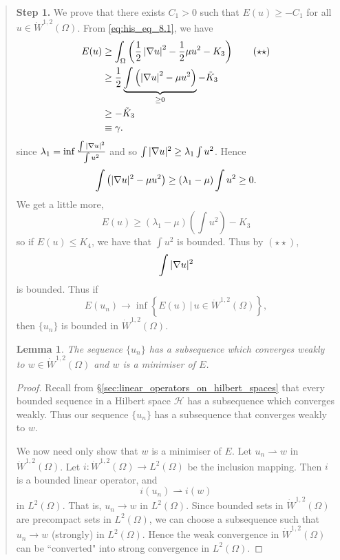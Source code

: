 \documentclass[10pt, oneside, reqno]{amsart}
\theoremstyle{plain}%
\newtheorem{lem}[thm]{Lemma}
\numberwithin{equation}{section}
\theoremstyle{definition}
\theoremstyle{remark}
\newcommand{\given}{ \, | \,}
\begin{document}
\begin{quote}\textbf{Step 1.}
    We prove that there exists $C_1 > 0$ such that $E(u) \geq - C_1$ for all $u \in \dot W^{1, 2}(\Omega)$.  From \eqref{eq:his_eq_8.1}, we have \begin{align*}
        E(u) &\geq \int_\Omega \left( \frac{1}{2} \left| \nabla u \right|^2 - \frac{1}{2} \mu u^2 - K_3 \right) \tag{$\star \star$} \\
        &\geq \frac{1}{2} \underbrace{\int \left( \left| \nabla u \right|^2 - \mu u^2 \right)}_{\geq 0} - \tilde K_3 \\
        & \geq - \tilde K_3 \\
        & \equiv \gamma.
    \end{align*} since $\lambda_1 = \inf \frac{\int|\nabla u |^2}{\int u^2}$ and so $\int |\nabla u|^2 \geq \lambda_1 \int u^2$.  Hence \[
        \int \left( |\nabla u |^2 - \mu u^2 \right) \geq (\lambda_1 - \mu) \int u^2 \geq 0.
    \]  We get a little more, \[
        E(u) \geq (\lambda_1 - \mu) \left(\int u^2 \right)
 - K_3  \] so if $E(u) \leq K_4$, we have that $\int u^2$ is bounded.  Thus by $(\star \star)$, \[
    \int |\nabla u|^2
 \] is bounded.  Thus if \[
    E(u_n) \rightarrow \inf \left\{E(u) \given u \in \dot W^{1, 2}(\Omega) \right\},
\] then $\{ u_n \}$ is bounded in $\dot W^{1 ,2}(\Omega)$. 

\begin{lem}
     The sequence $\{ u_n \}$ has a subsequence which converges weakly to $w  \in \dot W^{1, 2}(\Omega)$ and $w$ is a minimiser of $E$.
\end{lem}
\begin{proof}
    Recall from \S \ref{sec:linear_operators_on_hilbert_spaces} that every bounded sequence in a Hilbert space $\mathcal H$ has a subsequence which converges weakly. Thus our sequence $\{ u_n \}$ has a subsequence that converges weakly to $w$.  
    
    We now need only show that $w$ is a minimiser of $E$.   Let $u_n \rightharpoonup w$ in $\dot W^{1, 2}(\Omega)$.  Let $i: \dot W^{1, 2}(\Omega) \rightarrow L^2(\Omega)$ be the inclusion mapping.  Then $i$ is a bounded linear operator, and \[
        i(u_n) \rightharpoonup i(w)
    \] in $L^2(\Omega)$.  That is, $u_n \rightarrow w$ in $L^2(\Omega)$.  Since bounded sets in $\dot W^{1, 2}(\Omega)$ are precompact sets in $L^2(\Omega)$, we can choose a subsequence such that $u_n \rightarrow w$ (strongly) in $L^2(\Omega)$.  Hence the weak convergence in $\dot W^{1, 2}(\Omega)$ can be ``converted" into strong convergence in $L^2(\Omega)$.
    

\end{proof}
\end{quote}
\end{document}
